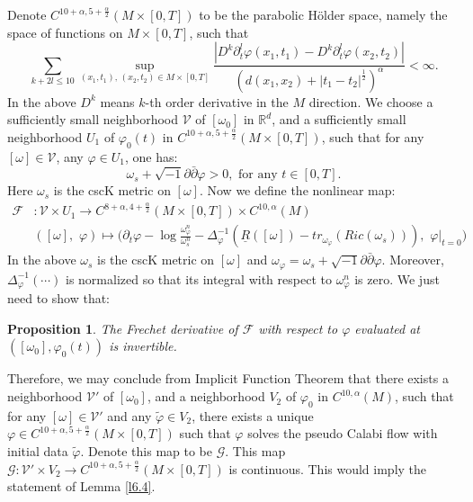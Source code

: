 \documentclass[11pt]{amsart}
\newtheorem{prop}[lem]{Proposition}
\numberwithin{equation}{section}
\newcommand{\bR}{ \mathbb{R}} %
\begin{document}
Denote $C^{10+\alpha,5+\frac{\alpha}{2}}(M\times [0,T])$ to be the parabolic H\"older space,  namely the space of functions on $M\times [0,T]$,  such that 
\begin{equation*}
\sum_{k+2l\le 10}\sup_{(x_1,t_1),\,(x_2,t_2)\in M\times [0,T]}\frac{|D^k\partial_t^l\varphi(x_1,t_1)-D^k\partial_t^l\varphi(x_2,t_2)|}{(d(x_1,x_2)+|t_1-t_2|^{\frac{1}{2}})^{\alpha}}<\infty.
\end{equation*}
In the above $D^k$ means $k$-th order derivative in the $M$ direction.  We choose a sufficiently small neighborhood $\mathcal{V}$ of $[\omega_0]$ in $\bR^d$,  and a sufficiently small neighborhood $U_1$ of $\varphi_0(t)$ in $C^{10+\alpha,5+\frac{\alpha}{2}}(M\times [0,T])$,  such that for any $[\omega]\in \mathcal{V}$,  any $\varphi\in U_1$,  one has:
\begin{equation*}
\omega_s+\sqrt{-1}\partial\bar{\partial}\varphi>0,\,\,\text{for any $t\in [0,T]$}.
\end{equation*}
Here $\omega_s$ is the cscK metric on $[\omega]$.
Now we define the nonlinear map:
\begin{equation*}
\begin{split}
\mathcal{F}&:\mathcal{V}\times U_1\rightarrow C^{8+\alpha,4+\frac{\alpha}{2}}(M\times [0,T])\times C^{10,\alpha}(M)\\
&([\omega],\,\,\varphi)\mapsto \big(\partial_t\varphi-\log\frac{\omega_{\varphi}^n}{\omega_s^n}-\Delta_{\varphi}^{-1}(\underline{R}([\omega])-tr_{\omega_{\varphi}}(Ric(\omega_s))),\,\,\varphi|_{t=0}\big)
\end{split}
\end{equation*}
In the above $\omega_s$ is the cscK metric on $[\omega]$ and $\omega_{\varphi}=\omega_s+\sqrt{-1}\partial\bar{\partial}\varphi$.  Moreover,  $\Delta_{\varphi}^{-1}(\cdots)$ is normalized so that its integral with respect to $\omega_{\varphi}^n$ is zero.  We just need to show that:
\begin{prop}
The Frechet derivative of $\mathcal{F}$ with respect to $\varphi$ evaluated at $([\omega_0],\varphi_0(t))$ is invertible.  
\end{prop}
Therefore,  we may conclude from Implicit Function Theorem that there exists a neighborhood $\mathcal{V}'$ of $[\omega_0]$,  and a neighborhood $V_2$ of $\varphi_0$ in $C^{10,\alpha}(M)$,  such that for any $[\omega]\in \mathcal{V}'$ and any $\tilde{\varphi}\in V_2$,  there exists a unique $\varphi\in C^{10+\alpha,5+\frac{\alpha}{2}}(M\times [0,T])$ such that $\varphi$ solves the pseudo Calabi flow with initial data $\tilde{\varphi}$.  Denote this map to be $\mathcal{G}$.  This map $\mathcal{G}:\mathcal{V}'\times V_2\rightarrow C^{10+\alpha,5+\frac{\alpha}{2}}(M\times [0,T])$ is continuous.  This would imply the statement of Lemma \ref{l6.4}.
\end{document}
